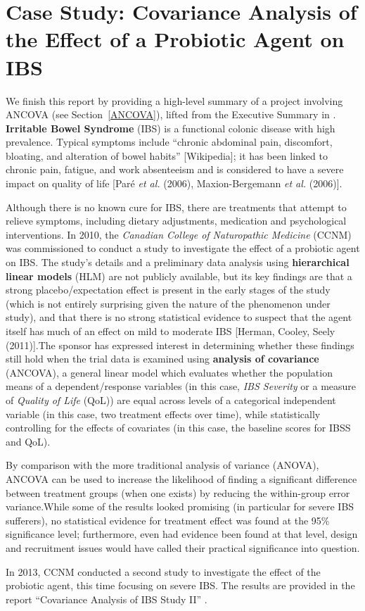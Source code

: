 \section[Case Study: ANCOVA for a Clinical Study]{Case Study: Covariance Analysis of the Effect of a Probiotic Agent on IBS}\label{sec:CCNM}
We finish this report by providing a high-level summary of a project involving ANCOVA (see Section~\ref{ANCOVA}), lifted from the Executive Summary in \cite{CQADS_IBS}. \newl 
\textbf{Irritable Bowel Syndrome} (IBS) is a functional colonic disease with high prevalence. Typical symptoms include ``chronic abdominal pain, discomfort, bloating, and alteration of bowel habits'' [Wikipedia]; it has been linked to chronic pain, fatigue, and work absenteeism and is considered to have a severe impact on quality of life [Par\'e \textit{et al.} (2006), Maxion-Bergemann \textit{et al.} (2006)]. \par Although there is no known cure for IBS, there are treatments that attempt to relieve symptoms, including dietary adjustments, medication and psychological interventions.
\newl In 2010, the \textit{Canadian College of Naturopathic Medicine} (CCNM) was commissioned to conduct a study to investigate the effect of a probiotic agent on IBS. The study's details and a preliminary data analysis using \textbf{hierarchical linear models} (HLM) are not publicly available, but its key findings are that a strong placebo/expectation effect is present in the early stages of the study (which is not entirely surprising given the nature of the phenomenon under study), and that there is no strong statistical evidence to suspect that the agent itself has much of an effect on mild to moderate IBS [Herman, Cooley, Seely (2011)].\newl  The sponsor has expressed interest in determining whether these findings still hold when the trial data is examined using \textbf{analysis of covariance} (ANCOVA), a general linear model which evaluates whether the population means of a dependent/response variables (in this case, \textit{IBS Severity} or a measure of \textit{Quality of Life} (QoL)) are equal across levels of a categorical independent variable (in this case, two treatment effects over time), while statistically controlling for the effects of covariates (in this case, the baseline scores for IBSS and QoL). \par By comparison with the more traditional analysis of variance (ANOVA), ANCOVA can be used to increase the likelihood of finding a significant difference between treatment groups (when one exists) by reducing the within-group error variance.\newl While some of the results looked promising (in particular for severe IBS sufferers), no statistical evidence for treatment effect was found at the 95\% significance level; furthermore, even had evidence been found at that level, design and recruitment issues would have called their practical significance into question. \par In 2013, CCNM conducted a second study to investigate the effect of the probiotic agent, this time focusing on severe IBS. The results are provided in the report ``Covariance Analysis of IBS Study II'' \cite{CQADS_IBS}.
